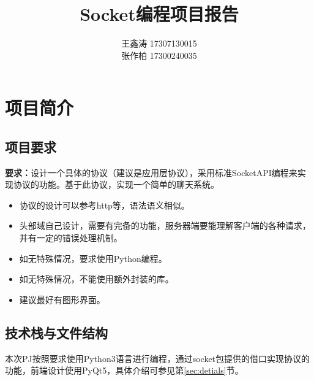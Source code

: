 \documentclass[12pt]{article} %
\title{\textbf{Socket编程项目报告}}
\author{王鑫涛 17307130015\\张作柏 17300240035}
\begin{document}
\begin{sloppypar}
\maketitle

\pagestyle{fancy}
\lhead{\textbf{{\thetitle}}}
\rhead{\textbf{\nouppercase{\firstleftmark}}}
\cfoot{\thepage}

\thispagestyle{empty}
\tableofcontents
\clearpage

\setcounter{page}{1}


\section{项目简介}

\subsection{项目要求}

{\bf 要求：}设计一个具体的协议（建议是应用层协议），采用标准SocketAPI编程来实现协议的功能。基于此协议，实现一个简单的聊天系统。

\begin{itemize}
	\item 协议的设计可以参考http等，语法语义相似。\vspace*{-1.5mm}
	\item 头部域自己设计，需要有完备的功能，服务器端要能理解客户端的各种请求，并有一定的错误处理机制。\vspace*{-1.5mm}
	\item 如无特殊情况，要求使用Python编程。\vspace*{-1.5mm}
	\item 如无特殊情况，不能使用额外封装的库。\vspace*{-1.5mm}
	\item 建议最好有图形界面。\vspace*{-1.5mm}
\end{itemize}

\subsection{技术栈与文件结构}

本次PJ按照要求使用Python3语言进行编程，通过socket包提供的借口实现协议的功能，前端设计使用PyQt5，具体介绍可参见第\ref{sec:detials}节。


\end{sloppypar}
\end{document}
